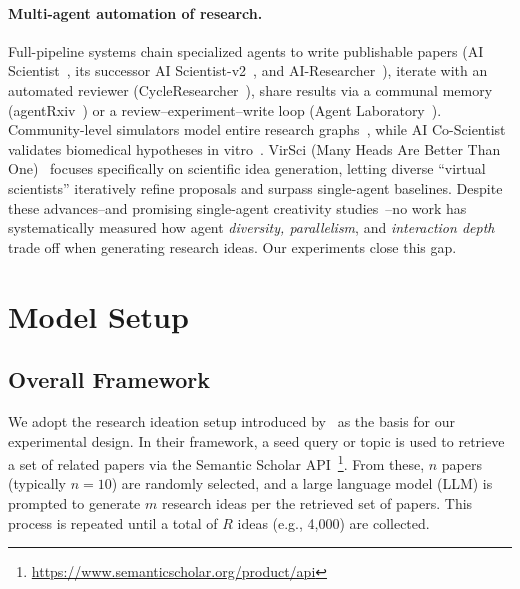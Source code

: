 \documentclass[11pt]{article}
\begin{document}
\paragraph{Multi-agent automation of research.}
Full-pipeline systems chain specialized agents to write publishable papers (AI Scientist~\cite{lu2024aiscientist}, its successor AI Scientist-v2~\cite{yamada2025aiscientistv2}, and AI-Researcher~\cite{tang2025airesearcher}), iterate with an automated reviewer (CycleResearcher~\cite{weng2025cycleresearcher}), share results via a communal memory (agentRxiv~\cite{schmidgall2025agentrxiv}) or a review–experiment–write loop (Agent Laboratory~\cite{schmidgall2025agentlab}).
Community-level simulators model entire research graphs~\cite{yu2024researchtown}, while AI Co-Scientist validates biomedical hypotheses in vitro~\cite{gottweis2025aicoscientist}. 
VirSci (Many Heads Are Better Than One)~\cite{su2025manyheads} focuses specifically on scientific idea generation, letting diverse ``virtual scientists'' iteratively refine proposals and surpass single-agent baselines.
Despite these advances--and promising single-agent creativity studies~\cite{si2025can}--no work has systematically measured how agent \emph{diversity, parallelism}, and \emph{interaction depth} trade off when generating research ideas.
Our experiments close this gap.


\section{Model Setup}

\subsection{Overall Framework}

We adopt the research ideation setup introduced by~\citet{si2025can} as the basis for our experimental design. In their framework, a seed query or topic is used to retrieve a set of related papers via the Semantic Scholar API~\footnote{\url{https://www.semanticscholar.org/product/api}}. From these, $n$ papers (typically $n=10$) are randomly selected, and a large language model (LLM) is prompted to generate $m$ research ideas per the retrieved set of papers. This process is repeated until a total of $R$ ideas (e.g., 4,000) are collected.
\end{document}
